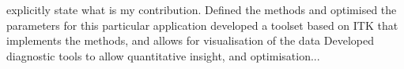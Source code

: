
explicitly state what is my contribution. 
Defined the methods and optimised the parameters for this particular application
developed a toolset based on ITK that implements the methods, and allows for visualisation of the data
Developed diagnostic tools to allow quantitative insight, and optimisation...

